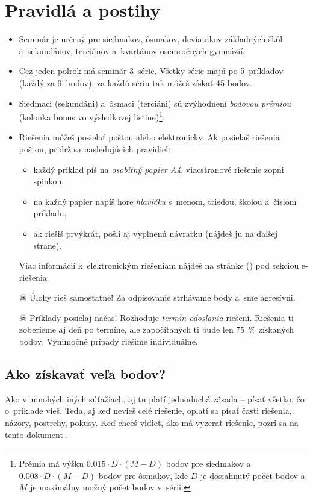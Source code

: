 \pagestyle{rules}
\section{Pravidlá a postihy}
\begin{itemize}
	\item Seminár je určený pre siedmakov, ôsmakov, deviatakov základných škôl a~sekundánov, terciánov a~kvartánov osemročných gymnázií. 

	\item Cez jeden polrok má seminár 3~série. Všetky série majú po 5~príkladov (každý za 9~bodov), za každú sériu tak môžeš získať 45 bodov.

	\item Siedmaci (sekundáni) a~ôsmaci (terciáni) sú zvýhodnení \emph{bodovou prémiou} (kolonka bonus vo výsledkovej listine)\footnote{%
		Prémia má výšku $\num{0.015} \cdot D \cdot (M - D)$ bodov pre siedmakov a $\num{0.008} \cdot D \cdot (M - D)$ bodov pre ôsmakov,
		kde $D$ je dosiahnutý počet bodov a $M$ je maximálny možný počet bodov v~sérii.}.

	\item Riešenia môžeš posielať poštou alebo elektronicky. Ak posielaš riešenia poštou, pridrž sa nasledujúcich pravidiel:
		\begin{itemize}
			\item každý príklad píš na \emph{osobitný papier A4}, viacstranové riešenie zopni spinkou,
			\item na každý papier napíš hore \emph{hlavičku} s~menom, triedou, školou a~číslom príkladu,
			\item ak riešiš prvýkrát, pošli aj vyplnenú návratku (nájdeš ju na ďalšej strane).
		\end{itemize}
	Viac informácií k~elektronickým riešeniam nájdeš na stránke (\URL{\seminarURL}) pod sekciou e-riešenia.

	\item[$\skull$] Úlohy rieš samostatne! Za odpisovanie strhávame body a~sme agresívni. 

	\item[$\skull$] Príklady posielaj načas! Rozhoduje \emph{termín odoslania} riešení. Riešenia ti zoberieme aj deň po termíne, ale započítaných ti bude len \SI{75}{\percent} získaných bodov.
		Výnimočné prípady riešime individuálne.
\end{itemize}

\subsection{Ako získavať veľa bodov?}
	Ako v~mnohých iných súťažiach, aj tu platí jednoduchá zásada -- písať všetko, čo o~príklade vieš. Teda, aj keď nevieš celé riešenie, oplatí sa písať časti
	riešenia, názory, postrehy, pokusy. Keď chceš vidieť, ako má vyzerať riešenie, pozri sa na tento dokument .


